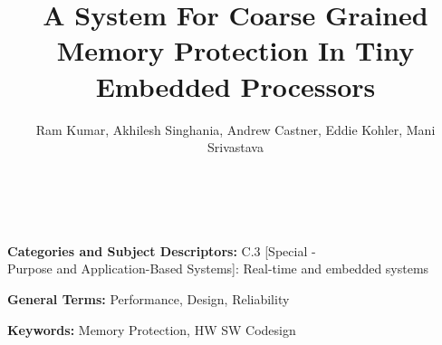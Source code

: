 \documentclass{sig-alternate}
\begin{document}
\date{}

\title{A System For Coarse Grained Memory Protection In Tiny Embedded Processors}

\author{
\alignauthor Ram Kumar, Akhilesh Singhania, Andrew Castner, Eddie Kohler, Mani Srivastava \\
	\\
	\\
}

\maketitle
\thispagestyle{empty}


\begin{abstract}

\end{abstract}
%

\vspace{1mm}
\noindent
{\bf Categories and Subject Descriptors:} C.3 {[Special - \\Purpose and Application-Based Systems]}: {Real-time and embedded systems}

\vspace{1mm}
\noindent
{\bf General Terms:} Performance, Design, Reliability

\vspace{1mm}
\noindent
{\bf Keywords:} Memory Protection, HW SW Codesign








\footnotesize{


}
\end{document}
